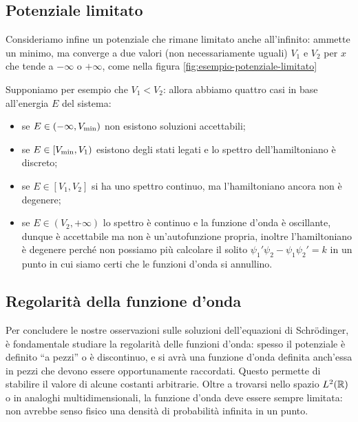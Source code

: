 \subsection{Potenziale limitato}
Consideriamo infine un potenziale che rimane limitato anche all'infinito: ammette un minimo, ma converge a due valori (non necessariamente uguali) $V_1$ e $V_2$ per $x$ che tende a $-\infty$ o $+\infty$, come nella figura \ref{fig:esempio-potenziale-limitato}

Supponiamo per esempio che $V_1<V_2$: allora abbiamo quattro casi in base all'energia $E$ del sistema:
\begin{itemize}
	\item se $E\in(-\infty,V_\textup{min})$ non esistono soluzioni accettabili;
	\item se $E\in[V_\textup{min},V_1)$ esistono degli stati legati e lo spettro dell'hamiltoniano è discreto;
	\item se $E\in[V_1,V_2]$ si ha uno spettro continuo, ma l'hamiltoniano ancora non è degenere;
	\item se $E\in(V_2,+\infty)$ lo spettro è continuo e la funzione d'onda è oscillante, dunque è accettabile ma non è un'autofunzione propria, inoltre l'hamiltoniano è degenere perch\'e non possiamo più calcolare il solito $\psi_1'\psi_2-\psi_1\psi_2'=k$ in un punto in cui siamo certi che le funzioni d'onda si annullino.
\end{itemize}

\subsection{Regolarità della funzione d'onda}
Per concludere le nostre osservazioni sulle soluzioni dell'equazioni di Schr\"odinger, è fondamentale studiare la regolarità delle funzioni d'onda: spesso il potenziale è definito ``a pezzi'' o è discontinuo, e si avrà una funzione d'onda definita anch'essa in pezzi che devono essere opportunamente raccordati.
Questo permette di stabilire il valore di alcune costanti arbitrarie.
Oltre a trovarsi nello spazio $L^2(\mathbb{R})$ o in analoghi multidimensionali, la funzione d'onda deve essere sempre limitata: non avrebbe senso fisico una densità di probabilità infinita in un punto.

